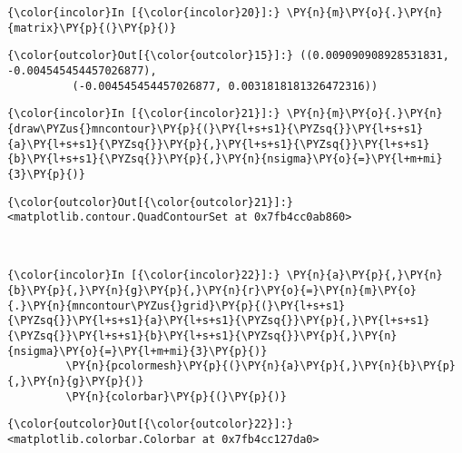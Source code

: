     \begin{Verbatim}[commandchars=\\\{\}]
{\color{incolor}In [{\color{incolor}20}]:} \PY{n}{m}\PY{o}{.}\PY{n}{matrix}\PY{p}{(}\PY{p}{)}
\end{Verbatim}


\begin{Verbatim}[commandchars=\\\{\}]
{\color{outcolor}Out[{\color{outcolor}15}]:} ((0.009090908928531831, -0.004545454457026877),
          (-0.004545454457026877, 0.0031818181326472316))
\end{Verbatim}
            
    \begin{Verbatim}[commandchars=\\\{\}]
{\color{incolor}In [{\color{incolor}21}]:} \PY{n}{m}\PY{o}{.}\PY{n}{draw\PYZus{}mncontour}\PY{p}{(}\PY{l+s+s1}{\PYZsq{}}\PY{l+s+s1}{a}\PY{l+s+s1}{\PYZsq{}}\PY{p}{,}\PY{l+s+s1}{\PYZsq{}}\PY{l+s+s1}{b}\PY{l+s+s1}{\PYZsq{}}\PY{p}{,}\PY{n}{nsigma}\PY{o}{=}\PY{l+m+mi}{3}\PY{p}{)}
\end{Verbatim}

\begin{Verbatim}[commandchars=\\\{\}]
{\color{outcolor}Out[{\color{outcolor}21}]:} <matplotlib.contour.QuadContourSet at 0x7fb4cc0ab860>
\end{Verbatim}
            
    \begin{center}
    \end{center}
    { \hspace*{\fill} \\}
    
    \begin{Verbatim}[commandchars=\\\{\}]
{\color{incolor}In [{\color{incolor}22}]:} \PY{n}{a}\PY{p}{,}\PY{n}{b}\PY{p}{,}\PY{n}{g}\PY{p}{,}\PY{n}{r}\PY{o}{=}\PY{n}{m}\PY{o}{.}\PY{n}{mncontour\PYZus{}grid}\PY{p}{(}\PY{l+s+s1}{\PYZsq{}}\PY{l+s+s1}{a}\PY{l+s+s1}{\PYZsq{}}\PY{p}{,}\PY{l+s+s1}{\PYZsq{}}\PY{l+s+s1}{b}\PY{l+s+s1}{\PYZsq{}}\PY{p}{,}\PY{n}{nsigma}\PY{o}{=}\PY{l+m+mi}{3}\PY{p}{)}
         \PY{n}{pcolormesh}\PY{p}{(}\PY{n}{a}\PY{p}{,}\PY{n}{b}\PY{p}{,}\PY{n}{g}\PY{p}{)}
         \PY{n}{colorbar}\PY{p}{(}\PY{p}{)}
\end{Verbatim}


\begin{Verbatim}[commandchars=\\\{\}]
{\color{outcolor}Out[{\color{outcolor}22}]:} <matplotlib.colorbar.Colorbar at 0x7fb4cc127da0>
\end{Verbatim}
            
